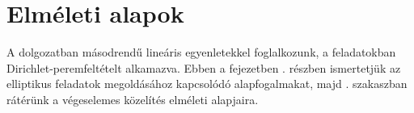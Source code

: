 \chapter{Elméleti alapok}\label{ch:elmelet}


A dolgozatban másodrendű lineáris egyenletekkel foglalkozunk, a feladatokban Dirichlet-peremfeltételt alkamazva. Ebben a fejezetben . részben ismertetjük az elliptikus feladatok megoldásához kapcsolódó alapfogalmakat, majd . szakaszban rátérünk a végeselemes közelítés elméleti alapjaira.

